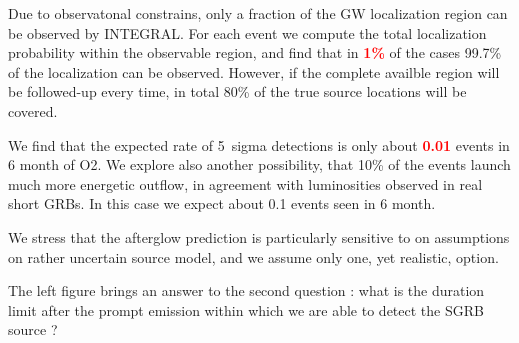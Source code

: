 \documentclass[a0,portrait]{a0poster}
\newcommand{\vs}[1] {\textbf{\textcolor{red}{#1}}}
\begin{document}
\begin{multicols}{2}
Due to observatonal constrains, only a fraction of the GW localization
region can be observed by INTEGRAL. For each event we compute the
total localization probability within the observable region, and find
that in \vs{1\%} of the cases 99.7\% of the localization can be
observed. However, if the complete availble region will be followed-up
every time, in total 80\% of the true source locations will be
covered.

We find that the expected rate of 5~sigma detections is only about
\vs{0.01} events in 6 month of O2. We explore also another
possibility, that 10\% of the events launch much more energetic
outflow, in agreement with luminosities observed in real short
GRBs. In this case we expect about 0.1 events seen in 6 month. 

We stress that the afterglow prediction is particularly sensitive to
on assumptions on rather uncertain source model, and we assume only
one, yet realistic, option.

\begin{center}\vspace{.5cm}
    \label{covered_region}
\end{center}

The left figure brings an answer to the second question : what is the duration
limit after the prompt emission within which we are able to detect the SGRB
source ?





\vspace{10mm}


\end{multicols}
\end{document}
